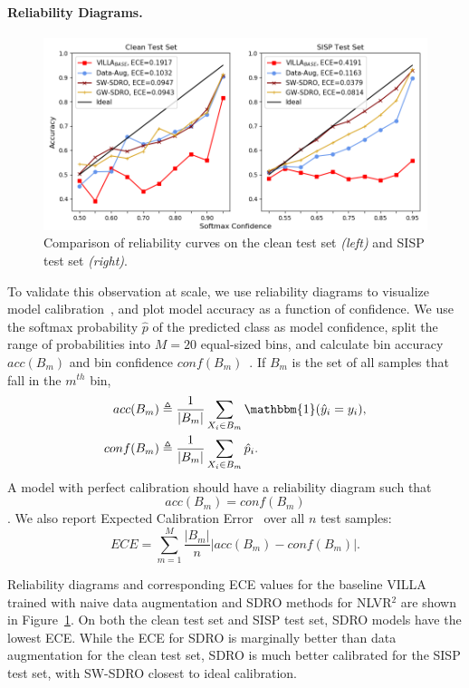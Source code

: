\paragraph{Reliability Diagrams.}
\begin{figure}
    \centering
    \includegraphics[width=\linewidth]{sdro/images/reliability.png}
    \caption{Comparison of reliability curves on the clean test set \textit{(left)} and SISP test set \textit{(right)}.}
    \label{fig:reliability}
\end{figure}
To validate this observation at scale, we use reliability diagrams to visualize model calibration~\citep{niculescu2005predicting}, and plot model accuracy as a function of confidence.
We use the softmax probability $\hat{p}$ of the predicted class as model confidence, split the range of probabilities into $M=20$ equal-sized bins, and calculate bin accuracy $acc(B_m)$ and bin confidence $conf(B_m)$~\citep{guo2017calibration}.
If $B_m$ is the set of all samples that fall in the $m^{th}$ bin,
\begin{align}
    acc(B_m) &\triangleq \frac{1}{|B_m|}\sum_{X_i\in B_m}\mathbbm{1}(\hat{y}_i = y_i), \\
    conf(B_m) &\triangleq \frac{1}{|B_m|}\sum_{X_i\in B_m} \hat{p}_i .
\end{align}
A model with perfect calibration should have a reliability diagram such that $$acc(B_m)=conf(B_m)$$.
We also report Expected Calibration Error~\citep{naeini2015obtaining} over all $n$ test samples:
\begin{equation}
    ECE=\sum_{m=1}^M\frac{|B_m|}{n}|acc(B_m){-}conf(B_m)|.
\end{equation}


Reliability diagrams and corresponding ECE values for the baseline VILLA trained with naive data augmentation and SDRO methods for NLVR$^2$ are shown in Figure~\ref{fig:reliability}.
On both the clean test set and SISP test set, SDRO models have the lowest ECE.
While the ECE for SDRO is marginally better than data augmentation for the clean test set, SDRO is much better calibrated for the SISP test set, with SW-SDRO closest to ideal calibration.

